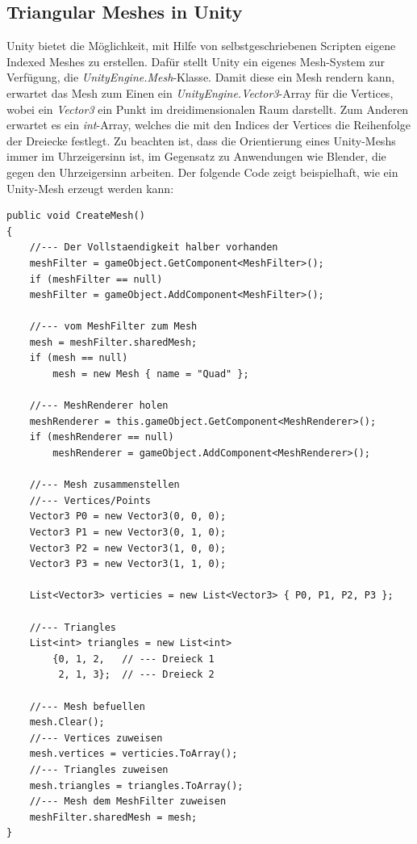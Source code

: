 \subsection{Triangular Meshes in Unity}
Unity bietet die M\"oglichkeit, mit Hilfe von selbstgeschriebenen Scripten eigene Indexed Meshes zu erstellen. Daf\"ur stellt Unity ein eigenes Mesh-System zur Verf\"ugung, die \textit{UnityEngine.Mesh}-Klasse. Damit diese ein Mesh rendern kann, erwartet das Mesh zum Einen ein \textit{UnityEngine.Vector3}-Array f\"ur die Vertices, wobei ein \textit{Vector3} ein Punkt im dreidimensionalen Raum darstellt. Zum Anderen erwartet es ein \textit{int}-Array, welches die mit den Indices der Vertices die Reihenfolge der Dreiecke festlegt. Zu beachten ist, dass die Orientierung eines Unity-Meshs immer im Uhrzeigersinn ist, im Gegensatz zu Anwendungen wie Blender, die gegen den Uhrzeigersinn arbeiten.  
Der folgende Code zeigt beispielhaft, wie ein Unity-Mesh erzeugt werden kann:\\
\begin{lstlisting}
public void CreateMesh()
{
	//--- Der Vollstaendigkeit halber vorhanden
	meshFilter = gameObject.GetComponent<MeshFilter>();
	if (meshFilter == null)
	meshFilter = gameObject.AddComponent<MeshFilter>();

	//--- vom MeshFilter zum Mesh
	mesh = meshFilter.sharedMesh;
	if (mesh == null)
		mesh = new Mesh { name = "Quad" };

	//--- MeshRenderer holen
	meshRenderer = this.gameObject.GetComponent<MeshRenderer>();
	if (meshRenderer == null)
		meshRenderer = gameObject.AddComponent<MeshRenderer>();

	//--- Mesh zusammenstellen
	//--- Vertices/Points
	Vector3 P0 = new Vector3(0, 0, 0);
	Vector3 P1 = new Vector3(0, 1, 0);
	Vector3 P2 = new Vector3(1, 0, 0);
	Vector3 P3 = new Vector3(1, 1, 0);

	List<Vector3> verticies = new List<Vector3> { P0, P1, P2, P3 };

	//--- Triangles
	List<int> triangles = new List<int> 
		{0, 1, 2, 	// --- Dreieck 1
		 2, 1, 3};	// --- Dreieck 2

	//--- Mesh befuellen
	mesh.Clear();
	//--- Vertices zuweisen
	mesh.vertices = verticies.ToArray();
	//--- Triangles zuweisen
	mesh.triangles = triangles.ToArray();
	//--- Mesh dem MeshFilter zuweisen
	meshFilter.sharedMesh = mesh;
}
\end{lstlisting}

